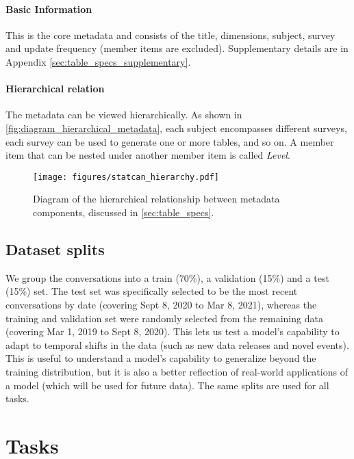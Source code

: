 \documentclass[11pt]{article}
\begin{document}
\paragraph{Basic Information} This is the core metadata and consists of the title, dimensions, subject, survey and update frequency (member items are excluded). Supplementary details are in Appendix \ref{sec:table_specs_supplementary}.

\paragraph{Hierarchical relation} The metadata can be viewed hierarchically. As shown in \autoref{fig:diagram_hierarchical_metadata}, each subject encompasses different surveys, each survey can be used to generate one or more tables, and so on. A member item that can be nested under another member item is called \textit{Level}.

\begin{figure}[t]
    \small
    \centering
    \texttt{[image: figures/statcan\_hierarchy.pdf]}
    \caption{Diagram of the hierarchical relationship between metadata components, discussed in \autoref{sec:table_specs}.\vspace{-3mm}}
    \label{fig:diagram_hierarchical_metadata}
\end{figure}



\subsection{Dataset splits}
\label{sec:conversation_selecting_splitting}
We group the conversations into a train (70\%), a validation (15\%) and a test (15\%) set. The test set was specifically selected to be the most recent conversations by date (covering Sept 8, 2020 to Mar 8, 2021), whereas the training and validation set were randomly selected from the remaining data (covering Mar 1, 2019 to Sept 8, 2020). This lets us test a model's capability to adapt to temporal shifts in the data (such as new data releases and novel events). This is useful to understand a model's capability to generalize beyond the training distribution, but it is also a better reflection of real-world applications of a model (which will be used for future data). The same splits are used for all tasks.



\section{Tasks}
\label{sec:tasks}
\end{document}
